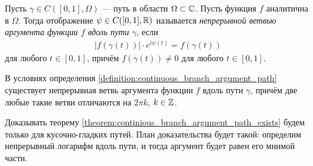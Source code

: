 \documentclass[../complex-analysis.tex]{subfiles}
\begin{document}
\begin{df}
\label{definition:continuous_branch_argument_path}
 Пусть $ \gamma \in C([0, 1], \Omega) $ --- путь в области $ \Omega \subset \mathbb{C} $. Пусть функция $ f $ аналитична в $ \Omega $. Тогда отображение $ \psi \in C([0,1], \mathbb{R}) $ называется \textit{непрерывной ветвью аргумента функции $ f $ вдоль пути $ \gamma $}, если
 \begin{align*}
  \left| f(\gamma(t)) \right| \cdot e^{i\psi(t)} = f(\gamma(t))
 \end{align*}
 для любого $ t \in [0,1] $, причём $ f(\gamma(t)) \neq 0 $ для любого $ t \in [0, 1] $.
\end{df}
\begin{thm}
\label{theorem:continious_branch_argument_path_exists}
В условиях определения \eqref{definition:continuous_branch_argument_path} существует непрерывная ветвь аргумента функции $ f $ вдоль пути $ \gamma $, причём две любые такие ветви отличаются на $ 2\pi k $, $ k \in \mathbb{Z} $.
\end{thm}
Доказывать теорему \eqref{theorem:continious_branch_argument_path_exists} будем только для кусочно-гладких путей. План доказательства будет такой: определим непрерывный логарифм вдоль пути, и тогда аргумент будет равен его мнимой части.
\end{document}
